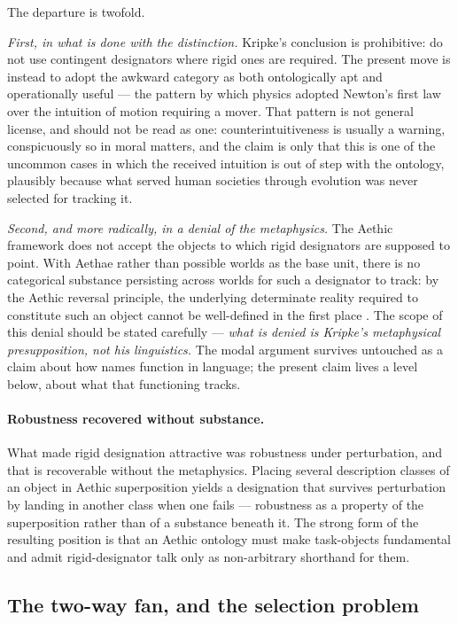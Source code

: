 \documentclass[11pt]{article}
\numberwithin{equation}{section}
\theoremstyle{plain}
\theoremstyle{definition}
\theoremstyle{remark}
\begin{document}
The departure is twofold.

\emph{First, in what is done with the distinction.} Kripke's conclusion
is prohibitive: do not use contingent designators where rigid ones are
required. The present move is instead to adopt the awkward category as
both ontologically apt and operationally useful --- the pattern by which
physics adopted Newton's first law over the intuition of motion
requiring a mover. That pattern is not general license, and should not
be read as one: counterintuitiveness is usually a warning, conspicuously
so in moral matters, and the claim is only that this is one of the
uncommon cases in which the received intuition is out of step with the
ontology, plausibly because what served human societies through
evolution was never selected for tracking it.

\emph{Second, and more radically, in a denial of the metaphysics.} The
Aethic framework does not accept the objects to which rigid designators
are supposed to point. With Aethae rather than possible worlds as the
base unit, there is no categorical substance persisting across worlds
for such a designator to track: by the Aethic reversal principle, the
underlying determinate reality required to constitute such an object
cannot be well-defined in the first place \cite{Aethus}. The scope of
this denial should be stated carefully --- \emph{what is denied is
Kripke's metaphysical presupposition, not his linguistics.} The modal
argument survives untouched as a claim about how names function in
language; the present claim lives a level below, about what that
functioning tracks.

\paragraph{Robustness recovered without substance.}\label{to:rem:robustness}
What made rigid designation attractive was robustness under
perturbation, and that is recoverable without the metaphysics. Placing
several description classes of an object in Aethic superposition yields
a designation that survives perturbation by landing in another class
when one fails --- robustness as a property of the superposition rather
than of a substance beneath it. The strong form of the resulting
position is that an Aethic ontology must make task-objects fundamental
and admit rigid-designator talk only as non-arbitrary shorthand for
them.

\subsection{The two-way fan, and the selection problem}
\label{to:sub:selection}
\end{document}
